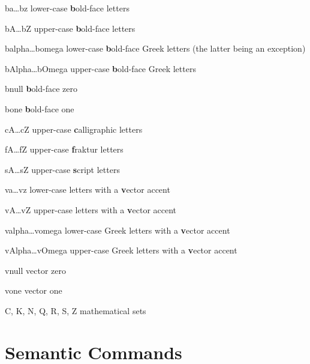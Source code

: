 \documentclass[english,a4paper,DIV=12,parskip=full]{scrartcl}
\begin{document}
    \begin{commandlist}
        \item[ba\ldots bz] lower-case \textbf{b}old-face letters \mathCodeExample{\br, \bf}
        \item[bA\ldots bZ] upper-case \textbf{b}old-face letters \mathCodeExample{\bR, \bF}
        \item[balpha\ldots bomega] lower-case \textbf{b}old-face Greek letters \mathCodeExample{\balpha,\boldeta} (the latter being an exception)
        \item[bAlpha\ldots bOmega] upper-case \textbf{b}old-face Greek letters \mathCodeExample{\bGamma,\bDelta}
        \item[bnull] \textbf{b}old-face zero \mathCodeExample{\bnull}
        \item[bone] \textbf{b}old-face one \mathCodeExample{\bone}
        \item[cA\ldots cZ] upper-case \textbf{c}alligraphic letters \mathCodeExample{\cM, \cN}\\
        \item[fA\ldots fZ] upper-case \textbf{f}raktur letters \mathCodeExample{\fM, \fN, \fX}\\
        \item[sA\ldots sZ] upper-case \textbf{s}cript letters \mathCodeExample{\sM, \sN, \sX}\\
        \item[va\ldots vz] lower-case letters with a \textbf{v}ector accent \mathCodeExample{\va,\vb}
        \item[vA\ldots vZ] upper-case letters with a \textbf{v}ector accent \mathCodeExample{\vA,\vB}
        \item[valpha\ldots vomega] lower-case Greek letters with a \textbf{v}ector accent \mathCodeExample{\valpha,\vbeta}
        \item[vAlpha\ldots vOmega] upper-case Greek letters with a \textbf{v}ector accent \mathCodeExample{\vGamma,\vDelta}
        \item[vnull] vector zero \mathCodeExample{\vnull}
        \item[vone] vector one \mathCodeExample{\vone}
        \item[C, K, N, Q, R, S, Z] mathematical sets \par\mathCodeExample{\C,\K,\N,\Q,\R,\S,\Z}
    \end{commandlist}

    \section{Semantic Commands}
\end{document}
